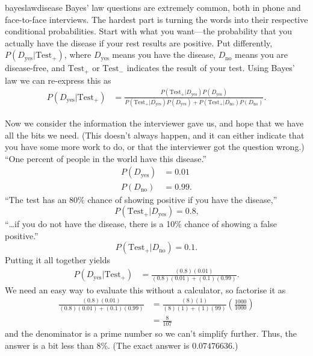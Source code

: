 \begin{answer}{bayeslawdisease}
Bayes' law questions are extremely common, both in phone and face-to-face interviews.
The hardest part is turning the words into their respective conditional probabilities.
Start with what you want---the probability that you actually have the disease if your rest results are positive.
Put differently, $P(D_\text{yes}|\text{Test}_+)$, where
$D_\text{yes}$ means you have the disease,
$D_\text{no}$ means you are disease-free,
and
$\text{Test}_+$ or
$\text{Test}_-$ indicates the result of your test.
Using Bayes' law we can re-express this as
\begin{align*}
P(D_\text{yes}|\text{Test}_+)
&=
\frac{
  P(
    \text{Test}_+
  |
    D_\text{yes}
  )
  P(
    D_\text{yes}
   )
}
{
  P(
    \text{Test}_+
  |
    D_\text{yes}
  )
  P(
    D_\text{yes}
   )
   +
  P(
    \text{Test}_+
  |
    D_\text{no}
  )
  P(
    D_\text{no}
   )
}
\text{.}
\end{align*}

Now we consider the information the interviewer gave us, and hope that we have all the bits we need. (This doesn't always happen, and it can either indicate that you have some more work to do, or that the interviewer got the question wrong.)
``One percent of people in the world have this disease.''
\begin{align*}
  P( D_\text{yes} ) & = 0.01 \\
  P( D_\text{no} ) & = 0.99
  \text{.}
\end{align*}
``The test has an 80\% chance of showing positive if you have the disease,''
\[
  P( \text{Test}_+ | D_\text{yes} ) = 0.8
  \text{,}
\]
``\ldots if you do not have the disease,
there is a 10\% chance of showing a false positive.''
\[
  P( \text{Test}_+ | D_\text{no} ) = 0.1
  \text{.}
\]
Putting it all together yields
\begin{align*}
P(D_\text{yes}|\text{Test}_+)
&= \frac{ (0.8)(0.01) }{ (0.8)(0.01) + (0.1)(0.99)  }
\text{.}
\end{align*}
We need an easy way to evaluate this without a calculator, so factorise it as
\begin{align*}
\frac{ (0.8)(0.01) }{ (0.8)(0.01) + (0.1)(0.99)  }
&= \frac{ (8)(1) }{ (8)(1) + (1)(99)  } \left( \frac{1000}{1000}  \right) \\
&= \frac{8}{107}
\end{align*}
and the denominator is a prime number so we can't simplify further.
Thus, the answer is a bit less than 8\%.
(The exact answer is $0.07476636$.)


\end{answer}
